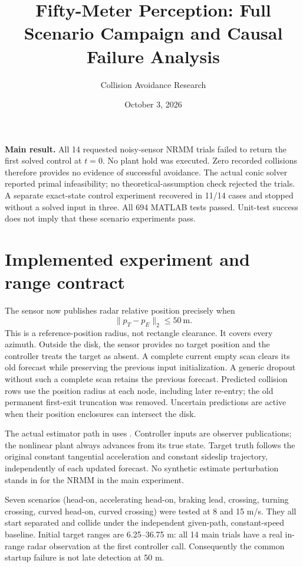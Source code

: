 \documentclass[11pt]{article}
\title{Fifty-Meter Perception: Full Scenario Campaign and Causal Failure Analysis}
\author{Collision Avoidance Research}
\date{October 3, 2026}
\begin{document}
\maketitle

\textbf{Main result.} All 14 requested noisy-sensor NRMM trials failed to return
the first solved control at $t=0$. No plant hold was executed. Zero recorded
collisions therefore provides no evidence of successful avoidance. The actual
conic solver reported primal infeasibility; no theoretical-assumption check
rejected the trials. A separate exact-state control experiment recovered in
11/14 cases and stopped without a solved input in three. All 694 MATLAB tests
passed. Unit-test success does not imply that these scenario experiments pass.

\section{Implemented experiment and range contract}
The sensor now publishes radar relative position precisely when
\[
 \|p_T-p_E\|_2\le 50\ \mathrm m.
\]
This is a reference-position radius, not rectangle clearance. It covers every
azimuth. Outside the disk, the sensor provides no target position and the
controller treats the target as absent. A complete current empty scan clears
its old forecast while preserving the previous input initialization. A generic
dropout without such a complete scan retains the previous forecast. Predicted
collision rows use the position radius at each node, including later re-entry;
the old permanent first-exit truncation was removed. Uncertain predictions are
active when their position enclosures can intersect the disk.

The actual estimator path in 
uses . Controller inputs are observer
publications; the nonlinear plant always advances from its true state. Target
truth follows the original constant tangential acceleration and constant
sideslip trajectory, independently of each updated forecast. No synthetic
estimate perturbation stands in for the NRMM in the main experiment.

Seven scenarios (head-on, accelerating head-on, braking lead, crossing,
turning crossing, curved head-on, curved crossing) were tested at 8 and
15 m/s. They all start separated and collide under the independent given-path,
constant-speed baseline. Initial target ranges are 6.25--36.75 m: all 14 main
trials have a real in-range radar observation at the first controller call.
Consequently the common startup failure is not late detection at 50 m.
\end{document}
